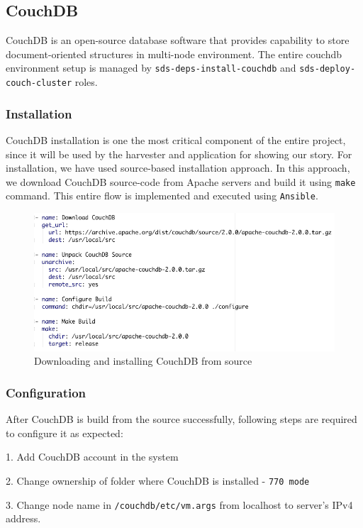 \subsection{CouchDB} \label{couchdb}
CouchDB is an open-source database software that provides capability to store document-oriented structures in multi-node environment. The entire couchdb environment setup is managed by \texttt{sds-deps-install-couchdb} and \texttt{sds-deploy-couch-cluster} roles.

\subsubsection{Installation}
CouchDB installation is one the most critical component of the entire project, since it will be used by the harvester and application for showing our story. For installation, we have used source-based installation approach. In this approach, we download CouchDB source-code from Apache servers and build it using \texttt{make} command. This entire flow is implemented and executed using \texttt{Ansible}.

\begin{figure}[H]
    \centering
    \includegraphics[width=12cm,keepaspectratio=true]{images/deployment/couchdb_installation.png}
    \caption{Downloading and installing CouchDB from source}
    \label{fig:couchinstallation1}
\end{figure}

\subsubsection{Configuration}
After CouchDB is build from the source successfully, following steps are required to configure it as expected:

1. Add CouchDB account in the system

2. Change ownership of folder where CouchDB is installed - \texttt{770 mode} 

3. Change node name in \texttt{/couchdb/etc/vm.args} from localhost to server's IPv4 address.

